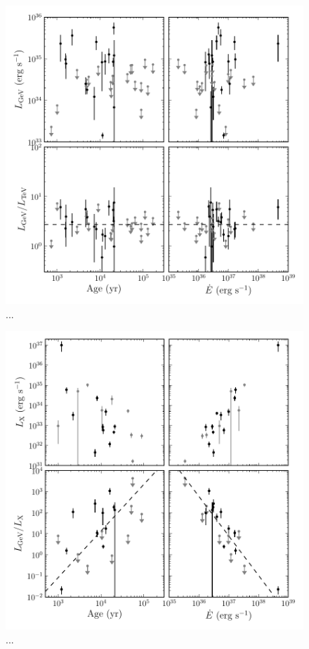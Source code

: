 \begin{figure}[htbp]
  \centering
  \includegraphics{chapters/population_study/figures/pwn_age_edot_vs_l_gev.pdf}
  \caption{...}
\end{figure}


\begin{figure}[htbp]
  \centering
  \includegraphics{chapters/population_study/figures/pwn_age_edot_vs_l_xray.pdf}
  \caption{...}
\end{figure}
